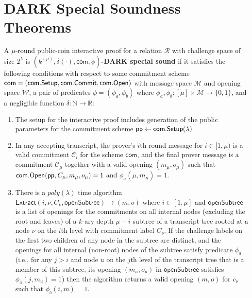 \section{DARK Special Soundness Theorems} 
\begin{definition}\label{def:darkspecialsoundness} A $\mu$-round public-coin interactive proof for a relation $\mathcal{R}$ with challenge space of size $2^\lambda$ is \textbf{$(k^{(\mu)}, \delta(\cdot), \textsf{com}, \phi)$-DARK special sound} if it satisfies the following conditions with respect to some commitment scheme $\mathsf{com} = (\textsf{com}.\textsf{Setup},\textsf{com}.\textsf{Commit}, \textsf{com}.\textsf{{Open}})$ with message space $\mathcal{M}$ and opening space $\mathcal{W}$, a pair of predicates $\phi = (\phi_a, \phi_b)$ where $\phi_a, \phi_b:[\mu] \times \mathcal{M}  \rightarrow \{0,1\}$, and a negligible function $\delta: \mathbb{N} \rightarrow \mathbb{R}$:

\begin{enumerate} 
\item The setup for the interactive proof includes generation of the public parameters for the commitment scheme $\textsf{pp} \gets \textsf{com}.\textsf{{Setup}}(\lambda)$.  
\item  In any accepting transcript, the prover's $i$th round message for $i \in [1,\mu)$ is a valid commitment $\mathcal{C}_i$ for the scheme $\mathsf{com}$, and the final prover message is a commitment $\mathcal{C}_\mu$ together with a valid opening $(m_\mu, o_\mu)$ such that $\textsf{com}.\textsf{{Open}}(\textsf{pp},C_\mu, m_\mu, o_\mu) = 1$ and $\phi_a(\mu, m_\mu) = 1$. 


\item  There is a $poly(\lambda)$ time algorithm $\textsf{Extract}(i, \nu, C_\nu, \textsf{openSubtree}) \rightarrow (m, o)$ where $i \in [1,\mu]$ and $\textsf{openSubtree}$ is a list of openings for the commitments on all internal nodes (excluding the root and leaves) of a $k$-ary depth $\mu - i$ subtree of a transcript tree rooted at a node $\nu$ on the $i$th level with commitment label $C_\nu$. If the challenge labels on the first two children of any node in the subtree are distinct, and the openings for all internal (non-root) nodes of the subtree satisfy predicate $\phi_a$ (i.e., for any $j > i$ and node $u$ on the $j$th level of the transcript tree that is a member of this subtree, its opening $(m_u, o_u)$ in $\textsf{openSubtree}$ satisfies $\phi_a(j, m_u)= 1$) then the algorithm returns a valid opening $(m,o)$ for $c_\nu$ such that $\phi_b(i, m) = 1$.  


\end{enumerate}
\end{definition}

